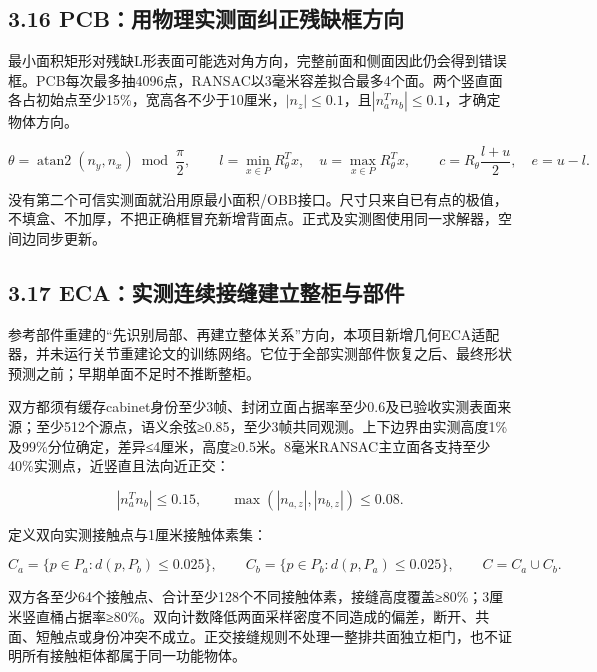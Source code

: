 \documentclass[UTF8,fontset=fandol]{ctexart}
\begin{document}
\subsection*{3.16 PCB：用物理实测面纠正残缺框方向}

最小面积矩形对残缺L形表面可能选对角方向，完整前面和侧面因此仍会得到错误框。PCB每次最多抽4096点，RANSAC以3毫米容差拟合最多4个面。两个竖直面各占初始点至少15\%，宽高各不少于10厘米，$|n_z|\leq0.1$，且$|n_a^Tn_b|\leq0.1$，才确定物体方向。



\[
\theta=\operatorname{atan2}(n_y,n_x)\bmod\frac\pi2,\qquad
l=\min_{x\in P}R_\theta^Tx,\quad u=\max_{x\in P}R_\theta^Tx,\qquad
c=R_\theta\frac{l+u}{2},\quad e=u-l.
\]

没有第二个可信实测面就沿用原最小面积/OBB接口。尺寸只来自已有点的极值，不填盒、不加厚，不把正确框冒充新增背面点。正式及实测图使用同一求解器，空间边同步更新。



\subsection*{3.17 ECA：实测连续接缝建立整柜与部件}

参考部件重建的“先识别局部、再建立整体关系”方向，本项目新增几何ECA适配器，并未运行关节重建论文的训练网络。它位于全部实测部件恢复之后、最终形状预测之前；早期单面不足时不推断整柜。



双方都须有缓存cabinet身份至少3帧、封闭立面占据率至少0.6及已验收实测表面来源；至少512个源点，语义余弦≥0.85，至少3帧共同观测。上下边界由实测高度1\%及99\%分位确定，差异≤4厘米，高度≥0.5米。8毫米RANSAC主立面各支持至少40\%实测点，近竖直且法向近正交：



\[
|n_a^Tn_b|\le0.15,\qquad\max(|n_{a,z}|,|n_{b,z}|)\le0.08.
\]

定义双向实测接触点与1厘米接触体素集：



\[
C_a=\{p\in P_a:d(p,P_b)\le0.025\},\qquad
C_b=\{p\in P_b:d(p,P_a)\le0.025\},\qquad
C=C_a\cup C_b.
\]

双方各至少64个接触点、合计至少128个不同接触体素，接缝高度覆盖≥80\%；3厘米竖直桶占据率≥80\%。双向计数降低两面采样密度不同造成的偏差，断开、共面、短触点或身份冲突不成立。正交接缝规则不处理一整排共面独立柜门，也不证明所有接触柜体都属于同一功能物体。
\end{document}
